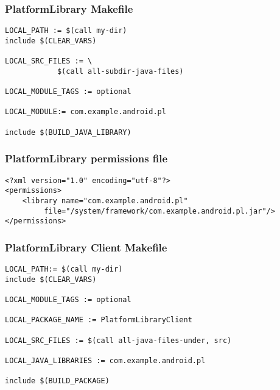 \begin{frame}[fragile]
  \frametitle{PlatformLibrary Makefile}
\begin{verbatim}
LOCAL_PATH := $(call my-dir)
include $(CLEAR_VARS)

LOCAL_SRC_FILES := \
            $(call all-subdir-java-files)

LOCAL_MODULE_TAGS := optional

LOCAL_MODULE:= com.example.android.pl

include $(BUILD_JAVA_LIBRARY)
\end{verbatim}
\end{frame}

\begin{frame}[fragile]
  \frametitle{PlatformLibrary permissions file}
\begin{verbatim}
<?xml version="1.0" encoding="utf-8"?>
<permissions>
    <library name="com.example.android.pl"
         file="/system/framework/com.example.android.pl.jar"/>
</permissions>
\end{verbatim}
\end{frame}

\begin{frame}[fragile]
  \frametitle{PlatformLibrary Client Makefile}
\begin{verbatim}
LOCAL_PATH:= $(call my-dir)
include $(CLEAR_VARS)

LOCAL_MODULE_TAGS := optional

LOCAL_PACKAGE_NAME := PlatformLibraryClient

LOCAL_SRC_FILES := $(call all-java-files-under, src)

LOCAL_JAVA_LIBRARIES := com.example.android.pl

include $(BUILD_PACKAGE)
\end{verbatim}
\end{frame}
